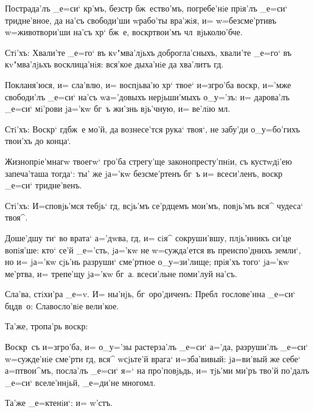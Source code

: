 Пострада'лъ _е=си` кр'мъ, безстр 
бж~ество'мъ, погребе'нiе прiя'лъ _е=си` тридне'вное, да 
на'съ свободи'ши w\т рабо'ты вра'жiя, и= w=безсме'ртивъ 
w=животвори'ши на'съ хр` бж~е, воскр твои'мъ 
чл~вjьколю'бче.

Стi'хъ: Хвали'те _е=го` въ кv"мва'лjьхъ 
доброгла'сныхъ, хвали'те _е=го` въ кv"мва'лjьхъ 
восклица'нiя: вся'кое дыха'нiе да хва'литъ гд.

Покланя'юся, и= сла'влю, и= воспjьва'ю хр` твое` 
и=з\ъ гро'ба воскр, и='мже свободи'лъ _е=си` на'съ 
w\т а='довыхъ нерjьши'мыхъ о_у='зъ: и= дарова'лъ _е=си` 
мi'рови jа='кw бг~ъ жи'знь вjь'чную, и= ве'лiю мл.

Стi'хъ: Воскр` гд бж~е мо'й, да вознесе'тся 
рука` твоя`, не забу'ди о_у=бо'гихъ твои'хъ до конца`.

Жизнопрiе'мнагw твоегw` гро'ба стрегу'ще 
законопресту'пнiи, съ кустwдi'ею запеча'таша тогда`: ты' 
же jа='кw безсме'ртенъ бг~ъ и= всеси'ленъ, воскр 
_е=си` тридне'венъ.

Стi'хъ: И=сповjь'мся тебjь` гд, всjь'мъ се'рдцемъ 
мои'мъ, повjь'мъ вся^ чудеса` твоя^.

Доше'дшу ти` во врата` а='дwва, гд, и= сiя^ 
сокруши'вшу, плjь'нникъ си'це вопiя'ше: кто` се'й 
_е='сть, jа='кw не w=сужда'ется въ преиспо'днихъ земли`, 
но и= jа='кw сjь'нь разруши` сме'ртное о_у=зи'лище; 
прiя'хъ того` jа='кw ме'ртва, и= трепе'щу jа='кw бг~а. 
всеси'льне поми'луй на'съ.

Сла'ва, стiхи'ра _е=v. И= ны'нjь, 
бг~оро'диченъ: Пребл~гослове'нна _е=си` бц дв~о: 
Славосло'вiе вели'кое.

Та'же, тропа'рь воскр:

Воскр~съ и=з\ъ гро'ба, и= о_у='зы растерза'лъ _е=си` 
а='да, разруши'лъ _е=си` w=сужде'нiе сме'рти гд, вся^ 
w\т сjьте'й врага` и=зба'вивый: jа=ви'вый же себе` 
а=п твои^мъ, посла'лъ _е=си` я=` на про'повjьдь, и= 
тjь'ми ми'ръ тво'й по'далъ _е=си` вселе'ннjьй, _е=ди'не 
многомл.

Та'же _е=ктенiи`: и= w'стъ.
